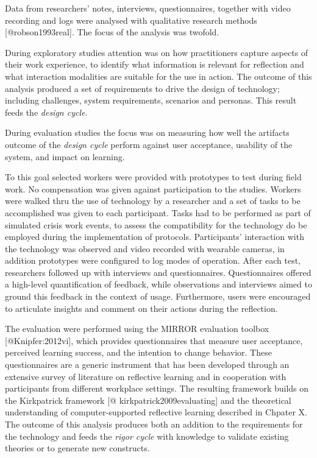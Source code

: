 Data from researchers' notes, interviews, questionnaires, together with
video recording and logs were analysed with qualitative research methods
{[}@robson1993real{]}. The focus of the analysis was twofold.

During exploratory studies attention was on how practitioners capture
aspects of their work experience, to identify what information is
relevant for reflection and what interaction modalities are suitable for
the use in action. The outcome of this analysis produced a set of
requirements to drive the design of technology; including challenges,
system requirements, scenarios and personas. This result feeds the
\emph{design cycle}.

During evaluation studies the focus was on measuring how well the
artifacts outcome of the \emph{design cycle} perform against user
acceptance, usability of the system, and impact on learning.

To this goal selected workers were provided with prototypes to test
during field work. No compensation was given against participation to
the studies. Workers were walked thru the use of technology by a
researcher and a set of tasks to be accomplished was given to each
participant. Tasks had to be performed as part of simulated crisis work
events, to assess the compatibility for the technology do be employed
during the implementation of protocols. Participants' interaction with
the technology was observed and video recorded with wearable cameras, in
addition prototypes were configured to log modes of operation. After
each test, researchers followed up with interviews and questionnaires.
Questionnaires offered a high-level quantification of feedback, while
observations and interviews aimed to ground this feedback in the context
of usage. Furthermore, users were encouraged to articulate insights and
comment on their actions during the reflection.

The evaluation were performed using the MIRROR evaluation toolbox
{[}@Knipfer:2012vi{]}, which provides questionnaires that measure user
acceptance, perceived learning success, and the intention to change
behavior. These questionnaires are a generic instrument that has been
developed through an extensive survey of literature on reflective
learning and in cooperation with participants from different workplace
settings. The resulting framework builds on the Kirkpatrick framework
{[}@
kirkpatrick2009evaluating{]}
and the theoretical understanding of computer-supported reflective
learning described in Chpater X. The outcome of this analysis produces
both an addition to the requirements for the technology and feeds the
\emph{rigor cycle} with knowledge to validate existing theories or to
generate new constructs.

